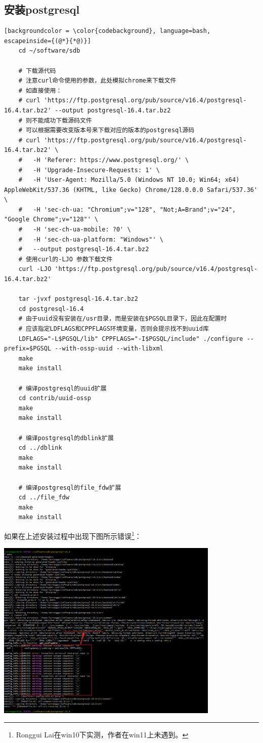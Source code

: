 \subsection{安装postgresql}
\begin{lstlisting}[backgroundcolor = \color{codebackground}, language=bash, escapeinside={(@*}{*@)}]
	cd ~/software/sdb
	
	# 下载源代码
	# 注意curl命令使用的参数，此处模拟chrome来下载文件
	# 如直接使用：
	# curl 'https://ftp.postgresql.org/pub/source/v16.4/postgresql-16.4.tar.bz2' --output postgresql-16.4.tar.bz2
	# 则不能成功下载源码文件
	# 可以根据需要改变版本号来下载对应的版本的postgresql源码
	# curl 'https://ftp.postgresql.org/pub/source/v16.4/postgresql-16.4.tar.bz2' \
	#	-H 'Referer: https://www.postgresql.org/' \
	#	-H 'Upgrade-Insecure-Requests: 1' \
	#	-H 'User-Agent: Mozilla/5.0 (Windows NT 10.0; Win64; x64) AppleWebKit/537.36 (KHTML, like Gecko) Chrome/128.0.0.0 Safari/537.36' \
	#	-H 'sec-ch-ua: "Chromium";v="128", "Not;A=Brand";v="24", "Google Chrome";v="128"' \
	#	-H 'sec-ch-ua-mobile: ?0' \
	#	-H 'sec-ch-ua-platform: "Windows"' \
	#	--output postgresql-16.4.tar.bz2
	# 使用curl的-LJO 参数下载文件
	curl -LJO 'https://ftp.postgresql.org/pub/source/v16.4/postgresql-16.4.tar.bz2'
	
	tar -jvxf postgresql-16.4.tar.bz2
	cd postgresql-16.4
	# 由于uuid没有安装在/usr目录，而是安装在$PGSQL目录下，因此在配置时
	# 应该指定LDFLAGS和CPPFLAGS环境变量，否则会提示找不到uuid库
	LDFLAGS="-L$PGSQL/lib" CPPFLAGS="-I$PGSQL/include" ./configure --prefix=$PGSQL --with-ossp-uuid --with-libxml
	make
	make install
	
	# 编译postgresql的uuid扩展
	cd contrib/uuid-ossp
	make
	make install
	
	# 编译postgresql的dblink扩展
	cd ../dblink
	make 
	make install
	
	# 编译postgresql的file_fdw扩展
	cd ../file_fdw
	make
	make install
\end{lstlisting}

如果在上述安装过程中出现下图所示错误\footnote{Ronggui Lai在win10下实测，作者在win11上未遇到。}：

\begin{center}
	\includegraphics[width=0.8\textwidth]{03install/postgresql_compile_error_1.png}
\end{center}

